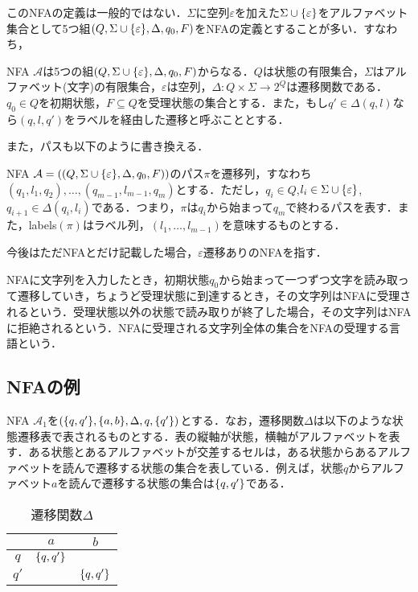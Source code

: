 \documentclass[a4paper, 12pt, dvipdfmx, uplatex]{jsreport}
\begin{document}
このNFAの定義は一般的ではない．$\Sigma$に空列$\varepsilon$を加えた$\Sigma \cup \qty{\varepsilon}$をアルファベット集合として5つ組$(Q,\Sigma \cup \qty{\varepsilon},\Delta,q_0,F)$をNFAの定義とすることが多い．すなわち，

\begin{dfn}[NFA]
  NFA $\mathcal{A}$は5つの組$(Q,\Sigma \cup \qty{\varepsilon},\Delta,q_0,F)$からなる．$Q$は状態の有限集合，$\Sigma$はアルファベット(文字)の有限集合，$\varepsilon$は空列，$\Delta :Q\times \Sigma \rightarrow 2^Q$は遷移関数である．$q_0 \in Q$を初期状態，$F \subseteq Q$を受理状態の集合とする．また，もし$q'\in \Delta (q,l)$なら$(q,l,q')$をラベルを経由した遷移と呼ぶこととする．
\end{dfn}

また，パスも以下のように書き換える．
\begin{dfn}[パス]
  NFA $\mathcal{A}=((Q,\Sigma \cup \qty{\varepsilon},\Delta,q_0,F))$のパス$\pi$を遷移列，すなわち$(q_1,l_1,q_2),\ldots,(q_{m-1},l_{m-1},q_{m})$とする．ただし，$q_i \in Q$,$l_i \in \Sigma \cup \qty{\varepsilon}$,$q_{i+1} \in \Delta(q_i,l_i)$である．つまり，$\pi$は$q_i$から始まって$q_m$で終わるパスを表す．また，labels$(\pi)$はラベル列，$(l_1,\ldots ,l_{m-1})$を意味するものとする．
\end{dfn}


今後はただNFAとだけ記載した場合，$\varepsilon$遷移ありのNFAを指す．

NFAに文字列を入力したとき，初期状態$q_0$から始まって一つずつ文字を読み取って遷移していき，ちょうど受理状態に到達するとき，その文字列はNFAに受理されるという．受理状態以外の状態で読み取りが終了した場合，その文字列はNFAに拒絶されるという．NFAに受理される文字列全体の集合をNFAの受理する言語という．



\subsection{NFAの例}
NFA $\mathcal{A}_1$を$(\qty{q,q'},\qty{a,b},\Delta,q,\qty{q'})$とする．なお，遷移関数$\Delta$は以下のような状態遷移表で表されるものとする．表の縦軸が状態，横軸がアルファベットを表す．ある状態とあるアルファベットが交差するセルは，ある状態からあるアルファベットを読んで遷移する状態の集合を表している．例えば，状態$q$からアルファベット$a$を読んで遷移する状態の集合は$\qty{q,q'}$である．

\begin{table}[H]
  \centering
  \caption{遷移関数$\Delta$\label{delta}}
  \begin{tabular}{c|c|c} \hline \hline
       & $a$  &$b$ \\\hline
    $q$  & $\qty{q,q'}$ &$\qty{}$ \\\hline
    $q'$ & $\qty{}$  &$\qty{q,q'}$ \\\hline
  \end{tabular}
\end{table}
\end{document}
